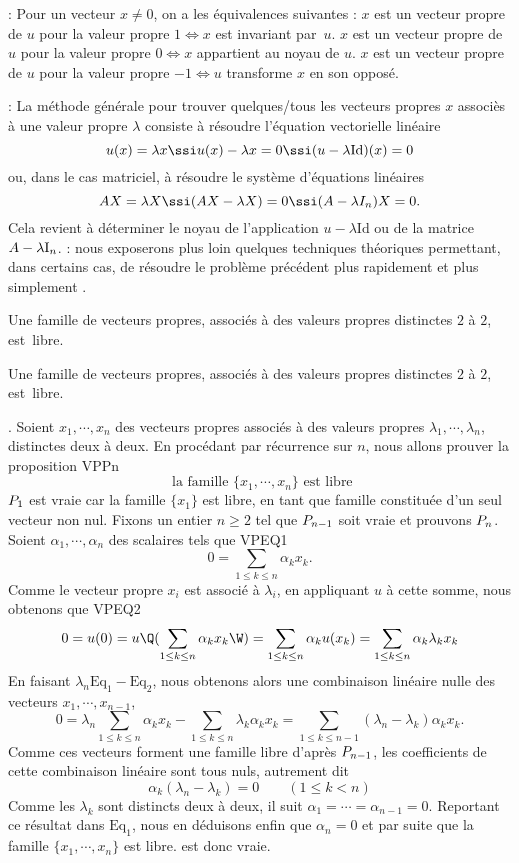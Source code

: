 \Remarque : Pour un vecteur $x\neq0$, on a les équivalences suivantes : \pn
$x$ est un vecteur propre de $u$ pour la valeur propre $1\Longleftrightarrow x$ est invariant par~$u$. \pn
$x$ est un vecteur propre de $u$ pour la valeur propre $0\Longleftrightarrow x$ appartient au noyau de $u$. \pn
$x$ est un vecteur propre de $u$ pour la valeur propre $-1\Longleftrightarrow u$ transforme $x$ en son opposé. 
\bigskip

\Remarque : La méthode générale pour trouver quelques/tous les vecteurs propres $x$ associès à une valeur propre $\lambda$ 
consiste à résoudre l'équation vectorielle linéaire 
$$
u(x)=\lambda x \ssi u(x)-\lambda x=0 \ssi (u-\lambda\mbox{Id})(x)=0
$$
ou, dans le cas matriciel, à résoudre le système d'équations linéaires 
$$
AX=\lambda X\ssi (AX-\lambda X)=0\ssi (A-\lambda I_n)X=0. 
$$
Cela revient à déterminer le noyau de l'application $u-\lambda \mbox{Id}$ ou de la matrice $A-\lambda\mbox I_n$. 
\bigskip
\Remarque : nous exposerons plus loin quelques techniques théoriques permettant, dans certains cas, 
de résoudre le problème précédent plus rapidement et plus simplement . 
\bigskip


\Propriete [$E$ $\ob K$-EV, $u\in\sc L(E)$] 
Une famille de vecteurs propres, associés à des valeurs propres distinctes $2$ à $2$, est~libre. 

\Invertedtrue
\Propriete [$n\ge1$, $A\in\sc M_n(\ob K)$]
Une famille de vecteurs propres, associés à des valeurs propres distinctes $2$ à $2$, est~libre. 


\Demonstration. Soient $x_1, \cdots, x_n$ des vecteurs propres associés à des valeurs propres $\lambda_1, \cdots, \lambda_n$, distinctes deux à deux. En procédant par récurrence sur $n$, nous allons prouver la proposition 
\Equation [$\sc P_n$] VPPn
$$
\mbox{ la famille }\{x_1, \cdots, x_n\} \mbox{ est libre}
$$
$\sc P_1$ est vraie car la famille $\{x_1\}$ est libre, en tant que famille constituée d'un seul vecteur non nul. \pn
Fixons un entier $n\ge2$ tel que $\sc P_{n-1}$ soit vraie et prouvons $\sc P_n$. 
Soient $\alpha_1,\cdots, \alpha_n$ des scalaires tels que 
\Equation [$\hbox{Eq}_1$] VPEQ1
$$
0=\sum\limits_{1\le k\le n}\alpha_kx_k. 
$$
Comme le vecteur propre $x_i$ est associé à $\lambda_i$, en appliquant $u$ à cette somme, nous obtenons que 
\Equation [$\hbox{Eq}_2$] VPEQ2
$$
0=u(0)=u\Q(\sum\limits_{1\le k\le n}\alpha_kx_k\W)=\sum\limits_{1\le k\le n}\alpha_ku(x_k)=\sum\limits_{1\le k\le n}\alpha_k\lambda_kx_k 
$$
En faisant $\lambda_n\mbox{Eq}_1-\mbox{Eq}_2$, nous obtenons alors une combinaison linéaire nulle des vecteurs $x_1, \cdots, x_{n-1}$, 
$$
0=\lambda_n\sum\limits_{1\le k\le n}\alpha_kx_k-\sum\limits_{1\le k\le n}\lambda_k\alpha_kx_k=\sum\limits_{1\le k\le n-1}(\lambda_n-\lambda_k)\alpha_kx_k.
$$
Comme ces vecteurs forment une famille libre d'après $\sc P_{n-1}$, les coefficients de cette combinaison linéaire sont tous nuls, autrement dit 
$$
\alpha_k(\lambda_n-\lambda_k)=0\qquad (1\le k<n)
$$
Comme les $\lambda_k$ sont distincts deux à deux, il suit $\alpha_1=\cdots=\alpha_{n-1}=0$. Reportant ce résultat dans $\mbox{Eq}_1$, nous en déduisons enfin que $\alpha_n=0$ et par suite que la famille $\{x_1,\cdots, x_n\}$ est libre.  est donc vraie. 
\CQFD

